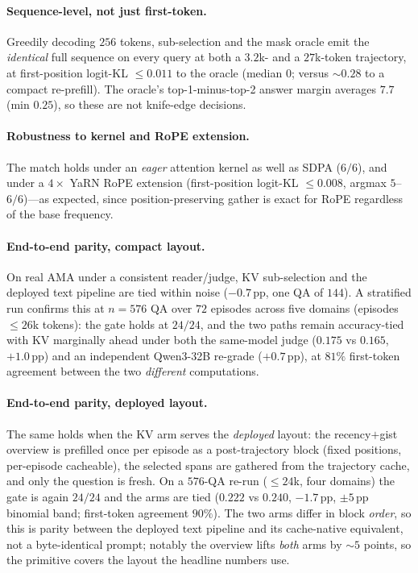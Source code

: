 \documentclass{article} %
\newcommand{\pp}{\,\mathrm{pp}}
\begin{document}
\paragraph{Sequence-level, not just first-token.} Greedily decoding $256$ tokens,
sub-selection and the mask oracle emit the \emph{identical} full sequence on every
query at both a $3.2$k- and a $27$k-token trajectory, at first-position logit-KL
$\le\!0.011$ to the oracle (median $0$; versus $\sim\!0.28$ to a compact
re-prefill). The oracle's top-1-minus-top-2 answer margin averages $7.7$ (min
$0.25$), so these are not knife-edge decisions.

\paragraph{Robustness to kernel and RoPE extension.} The match holds under an
\emph{eager} attention kernel as well as SDPA ($6/6$), and under a $4\times$ YaRN
RoPE extension (first-position logit-KL $\le\!0.008$, argmax $5$--$6/6$)---as
expected, since position-preserving gather is exact for RoPE regardless of the
base frequency.

\paragraph{End-to-end parity, compact layout.} On real AMA under a consistent
reader/judge, KV sub-selection and the deployed text pipeline are tied within
noise ($-0.7\pp$, one QA of $144$). A stratified run confirms this at $n{=}576$ QA
over $72$ episodes across five domains (episodes $\le26$k tokens): the gate holds
at $24/24$, and the two paths remain accuracy-tied with KV marginally ahead under
both the same-model judge ($0.175$ vs $0.165$, $+1.0\pp$) and an independent
Qwen3-32B re-grade ($+0.7\pp$), at $81\%$ first-token agreement between the two
\emph{different} computations.

\paragraph{End-to-end parity, deployed layout.} The same holds when the KV arm
serves the \emph{deployed} layout: the recency$+$gist overview is prefilled once
per episode as a post-trajectory block (fixed positions, per-episode cacheable),
the selected spans are gathered from the trajectory cache, and only the question
is fresh. On a $576$-QA re-run ($\le24$k, four domains) the gate is again $24/24$
and the arms are tied ($0.222$ vs $0.240$, $-1.7\pp$, $\pm5\pp$ binomial band;
first-token agreement $90\%$). The two arms differ in block \emph{order}, so this
is parity between the deployed text pipeline and its cache-native equivalent, not
a byte-identical prompt; notably the overview lifts \emph{both} arms by $\sim\!5$
points, so the primitive covers the layout the headline numbers use.
\end{document}
